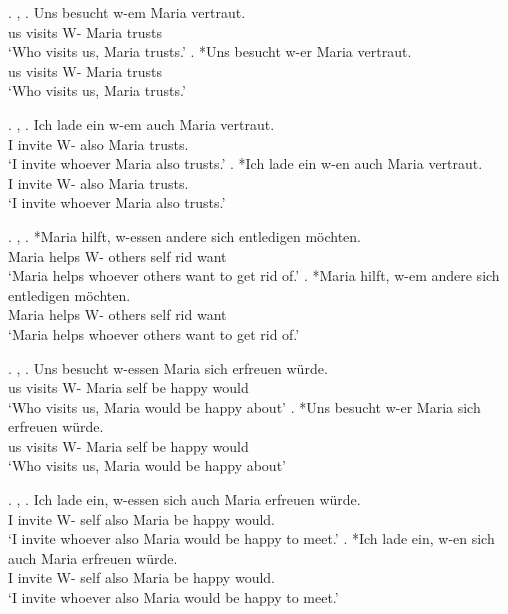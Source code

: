 \ex. , 
\ag. Uns besucht w-em Maria vertraut.\\
 us visits\scsub{[nom]} W- Maria trusts\scsub{[dat]}\\
 `Who visits us, Maria trusts.' \hfill \citep[343]{vogel2001}
\bg. *Uns besucht w-er Maria vertraut.\\
 us visits\scsub{[nom]} W- Maria trusts\scsub{[dat]}\\
 `Who visits us, Maria trusts.' \hfill \citep[343]{vogel2001}

\ex. , 
\ag. Ich {lade ein} w-em auch Maria vertraut. \\
 I invite\scsub{[acc]} W- also Maria trusts\scsub{[dat]}.\\
 `I invite whoever Maria also trusts.' \hfill \citep[344]{vogel2001}
\bg. *Ich {lade ein} w-en auch Maria vertraut. \\
 I invite\scsub{[acc]} W- also Maria trusts\scsub{[dat]}.\\
 `I invite whoever Maria also trusts.' \hfill \citep[344]{vogel2001}

\ex. , 
\ag. *Maria hilft, w-essen andere sich entledigen möchten.\\
 Maria helps\scsub{[dat]} W- others self rid\scsub{[gen]} want\\
 `Maria helps whoever others want to get rid of.' \hfill \citep[344]{vogel2001}
\bg. *Maria hilft, w-em andere sich entledigen möchten.\\
 Maria helps\scsub{[dat]} W- others self rid\scsub{[gen]} want\\
 `Maria helps whoever others want to get rid of.' \hfill \citep[344]{vogel2001}

\ex. , 
\ag. Uns besucht w-essen Maria sich erfreuen würde.\\
 us visits\scsub{[nom]} W- Maria self {be happy}\scsub{[gen]} would\\
 `Who visits us, Maria would be happy about' \hfill \citep[343]{vogel2001}
\bg. *Uns besucht w-er Maria sich erfreuen würde.\\
 us visits\scsub{[nom]} W- Maria self {be happy}\scsub{[gen]} would\\
 `Who visits us, Maria would be happy about' \hfill \citep[343]{vogel2001}

\ex. , 
\ag. Ich {lade ein}, w-essen sich auch Maria erfreuen würde.\\
 I invite\scsub{[acc]} W- self also Maria {be happy}\scsub{[gen]} would.\\
 `I invite whoever also Maria would be happy to meet.' \hfill \citep[344]{vogel2001}
\bg. *Ich {lade ein}, w-en sich auch Maria erfreuen würde.\\
 I invite\scsub{[acc]} W- self also Maria {be happy}\scsub{[gen]} would.\\
 `I invite whoever also Maria would be happy to meet.' \hfill \citep[344]{vogel2001}

